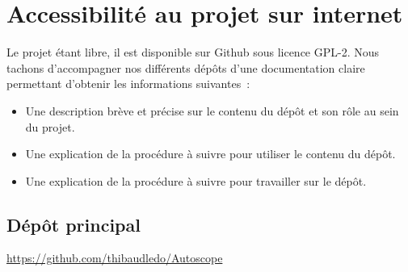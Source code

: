 \chapter{Accessibilité au projet sur internet}

Le projet étant libre, il est disponible sur Github sous licence GPL-2. Nous tachons d'accompagner nos différents dépôts d'une documentation claire permettant d'obtenir les informations suivantes~:
\begin{itemize}[label=$\bullet$]
	\item Une description brève et précise sur le contenu du dépôt et son rôle au sein du projet.
	\item Une explication de la procédure à suivre pour utiliser le contenu du dépôt.
	\item Une explication de la procédure à suivre pour travailler sur le dépôt.
	\end{itemize}

\section{Dépôt principal}

\url{https://github.com/thibaudledo/Autoscope}

\vspace{1cm}

